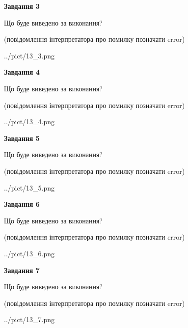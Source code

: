 \documentclass[12pt, ukrainian]{article}
\begin{document}
{\begin {large}
{\begin {center}\textbf{Завдання 3}\end {center}}\par
Що буде виведено за виконання?\par
 (повідомлення інтерпретатора про помилку позначати error)\par
\begin{center}
	{../pict/13_3.png}
\end{center}
\newpage

{\begin {center}\textbf{Завдання 4}\end {center}}\par
Що буде виведено за виконання?\par
 (повідомлення інтерпретатора про помилку позначати error)\par
\begin{center}
	{../pict/13_4.png}
\end{center}
\newpage

{\begin {center}\textbf{Завдання 5}\end {center}}\par
Що буде виведено за виконання?\par
 (повідомлення інтерпретатора про помилку позначати error)\par
\begin{center}
	{../pict/13_5.png}
\end{center}
\newpage

{\begin {center}\textbf{Завдання 6}\end {center}}\par
Що буде виведено за виконання?\par
 (повідомлення інтерпретатора про помилку позначати error)\par
\begin{center}
	{../pict/13_6.png}
\end{center}
\newpage

{\begin {center}\textbf{Завдання 7}\end {center}}\par
Що буде виведено за виконання?\par
 (повідомлення інтерпретатора про помилку позначати error)\par
\begin{center}
	{../pict/13_7.png}
\end{center}
\newpage


\end{large}}
\end{document}
